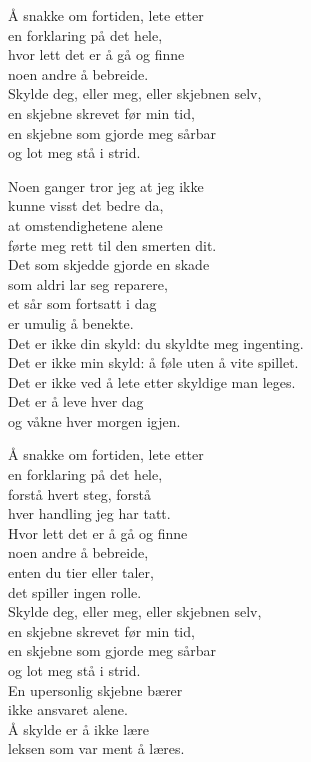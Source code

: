 \begin{lyrics}
Å snakke om fortiden, lete etter\\
en forklaring på det hele,\\
hvor lett det er å gå og finne\\
noen andre å bebreide.\\
Skylde deg, eller meg, eller skjebnen selv,\\
en skjebne skrevet før min tid,\\
en skjebne som gjorde meg sårbar\\
og lot meg stå i strid.

Noen ganger tror jeg at jeg ikke\\
kunne visst det bedre da,\\
at omstendighetene alene\\
førte meg rett til den smerten dit.\\
Det som skjedde gjorde en skade\\
som aldri lar seg reparere,\\
et sår som fortsatt i dag\\
er umulig å benekte.\\
Det er ikke din skyld: du skyldte meg ingenting.\\
Det er ikke min skyld: å føle uten å vite spillet.\\
Det er ikke ved å lete etter skyldige man leges.\\
Det er å leve hver dag\\
og våkne hver morgen igjen.

Å snakke om fortiden, lete etter\\
en forklaring på det hele,\\
forstå hvert steg, forstå\\
hver handling jeg har tatt.\\
Hvor lett det er å gå og finne\\
noen andre å bebreide,\\
enten du tier eller taler,\\
det spiller ingen rolle.\\
Skylde deg, eller meg, eller skjebnen selv,\\
en skjebne skrevet før min tid,\\
en skjebne som gjorde meg sårbar\\
og lot meg stå i strid.\\
En upersonlig skjebne bærer\\
ikke ansvaret alene.\\
Å skylde er å ikke lære\\
leksen som var ment å læres.
\end{lyrics}


